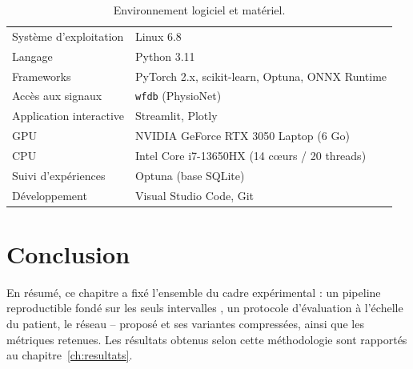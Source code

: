 \begin{table}[H]
  \centering
  \caption{Environnement logiciel et matériel.}
  \label{tab:meth:env}
  \begin{tabular}{ll}
    \toprule
    Système d'exploitation & Linux 6.8 \\
    Langage                & Python 3.11 \\
    Frameworks             & PyTorch 2.x, scikit-learn, Optuna, ONNX Runtime \\
    Accès aux signaux      & \texttt{wfdb} (PhysioNet) \\
    Application interactive & Streamlit, Plotly \\
    GPU                    & NVIDIA GeForce RTX 3050 Laptop (6 Go) \\
    CPU                    & Intel Core i7-13650HX (14 cœurs / 20 threads) \\
    Suivi d'expériences    & Optuna (base SQLite) \\
    Développement          & Visual Studio Code, Git \\
    \bottomrule
  \end{tabular}
\end{table}

\section{Conclusion}
\label{sec:meth:conclusion}
En résumé, ce chapitre a fixé l'ensemble du cadre expérimental : un pipeline reproductible fondé sur les seuls intervalles \RR{}, un protocole d'évaluation à l'échelle du patient, le réseau \CNN--\LSTM{} proposé et ses variantes compressées, ainsi que les métriques retenues. Les résultats obtenus selon cette méthodologie sont rapportés au chapitre~\ref{ch:resultats}.
